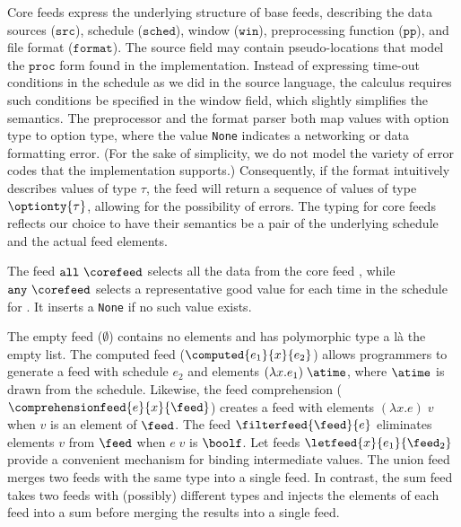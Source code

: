 Core feeds express the underlying structure of base feeds, describing
the data sources ($\mathtt{src}$), schedule ($\mathtt{sched}$), window
($\mathtt{win}$), preprocessing function ($\mathtt{pp}$), and file
format ($\mathtt{format}$).  The source field may contain
pseudo-locations that model the $\mathtt{proc}$ form found in the
implementation.  Instead of expressing time-out conditions in the
schedule as we did in the source language, the calculus requires such
conditions be specified in the window field, which slightly simplifies
the semantics.  The preprocessor and the format parser both map values
with option type to option type, where the value \texttt{None}
indicates a networking or data formatting error. (For the sake of
simplicity, we do not model the variety of error codes that the
implementation supports.)  Consequently, if the format intuitively
describes values of type $\tau$, the feed will return a sequence of
values of type $\optionty{\tau}$, allowing for the possibility of
errors.  The typing for core feeds reflects our choice to have their
semantics be a pair of the underlying schedule and the actual feed
elements.

The feed $\mathtt{all}\ \corefeed$ selects all the data from the core
feed \corefeed, while $\mathtt{any}\ \corefeed$ selects a
representative good value for each time in the schedule for \corefeed{}.
It inserts a \texttt{None} if no such value exists.  


The empty feed ($\emptyset$) contains no elements and has polymorphic
type a l\`a the empty list.  
The computed feed ($\computed{e_1}{x}{e_2}$) allows programmers to
generate a feed with schedule $e_2$ and elements $(\lambda x.e_1)\; \atime$,
where $\atime$ is drawn from the schedule. Likewise, the feed 
comprehension ($\comprehensionfeed{e}{x}{\feed}$) creates a
feed with elements $(\lambda x.e)\; v$ when $v$ is an element of $\feed$.
The feed
$\filterfeed{\feed}{e}$ eliminates elements $v$ from $\feed$ when
$e\; v$ is $\boolf$.  Let feeds $\letfeed{x}{e_1}{\feed_2}$
provide a convenient mechanism for binding intermediate values.
The union feed merges two feeds with the same type
into a single feed.  In contrast, the sum feed takes two feeds
with (possibly) different types and injects the elements of each feed
into a sum before merging the results into a single feed.  




